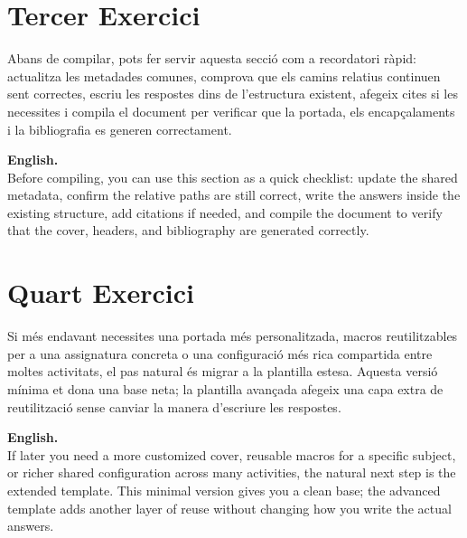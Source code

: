	\newpage
	\section[Exercici 3]{Tercer Exercici}
		Abans de compilar, pots fer servir aquesta secció com a recordatori ràpid: actualitza les metadades comunes, comprova que els camins relatius continuen sent correctes, escriu les respostes dins de l'estructura existent, afegeix cites si les necessites i compila el document per verificar que la portada, els encapçalaments i la bibliografia es generen correctament.
		\par\bigskip
		\textbf{English.}\\ Before compiling, you can use this section as a quick checklist: update the shared metadata, confirm the relative paths are still correct, write the answers inside the existing structure, add citations if needed, and compile the document to verify that the cover, headers, and bibliography are generated correctly.


	\newpage
	\section[Exercici 4]{Quart Exercici}
		Si més endavant necessites una portada més personalitzada, macros reutilitzables per a una assignatura concreta o una configuració més rica compartida entre moltes activitats, el pas natural és migrar a la plantilla estesa. Aquesta versió mínima et dona una base neta; la plantilla avançada afegeix una capa extra de reutilització sense canviar la manera d'escriure les respostes.
		\par\bigskip
		\textbf{English.}\\If later you need a more customized cover, reusable macros for a specific subject, or richer shared configuration across many activities, the natural next step is the extended template. This minimal version gives you a clean base; the advanced template adds another layer of reuse without changing how you write the actual answers.



